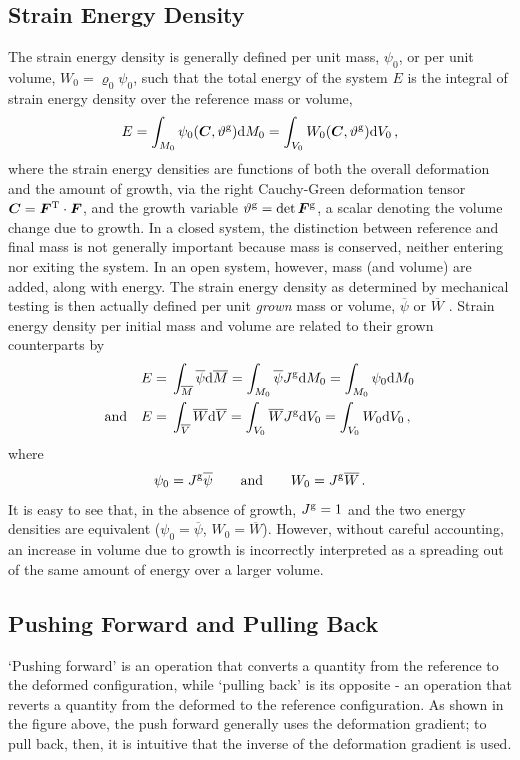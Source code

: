 \documentclass[10pt,letterpaper,oneside]{report}
\newcommand{\sca}[1]{\mbox{\rm{#1}}{}} %
\newcommand{\ten}[1]{\mbox{\boldmath $#1$}{}}
\newcommand{\scas}[1]{\mbox{{\scriptsize{${\rm{#1}}$}}}{}}
\begin{document}
\subsection{Strain Energy Density}
The strain energy density is generally defined per unit mass, $\psi_0$, or per unit volume, $W_0 = \varrho_0 \psi_0$, such that the total energy of the system $E$ is the integral of strain energy density over the reference mass or volume, 
\begin{equation}
E = \int_{M_0} \psi_0 ( \ten{C}, \vartheta^{\scas{g}} ) \sca{d}M_0 = \int_{V_0} W_0 ( \ten{C}, \vartheta^{\scas{g}} ) \sca{d}V_0 \, , 
\end{equation}
where the strain energy densities are functions of both the overall deformation and the amount of growth, via 
the right Cauchy-Green deformation tensor $\ten{C} = \ten{F}^{\scas{T}} \cdot \ten{F}$, and
the growth variable $\vartheta^{\scas{g}} = \det \ten{F}^{\scas{g}}$, a scalar denoting the volume change due to growth.  
In a closed system, the distinction between reference and final mass is not generally important because mass is conserved, neither entering nor exiting the system.  In an open system, however, mass (and volume) are added, along with energy.  The strain energy density as determined by mechanical testing is then actually defined per unit \textit{grown} mass or volume, $\overline{\psi}$ or $\overline{W}$ \cite{Ganghoffer2013}.  Strain energy density per initial mass and volume are related to their grown counterparts by 
\begin{align}
E ={}& \int_{\overline{M}} \overline{\psi} \sca{d}\overline{M} = \int_{M_0} \overline{\psi} J^{\scas{g}} \sca{d}M_0 = \int_{M_0} \psi_0 \sca{d}M_0 
\\ \mbox{and} \quad 
E ={}& \int_{\overline{V}} \overline{W} \sca{d}\overline{V} = \int_{V_0} \overline{W} J^{\scas{g}} \sca{d}V_0 = \int_{V_0} W_0 \sca{d}V_0 \, , 
\end{align}
where 
\begin{equation}
\psi_0 = J^{\scas{g}} \overline{\psi} \qquad \mbox{and} \qquad W_0 = J^{\scas{g}} \overline{W} \, . 
\end{equation}
It is easy to see that, in the absence of growth, $J^{\scas{g}} = 1$ and the two energy densities are equivalent ($\psi_0 = \overline{\psi}$, $W_0 = \overline{W}$).  However, without careful accounting, an increase in volume due to growth is incorrectly interpreted as a spreading out of the same amount of energy over a larger volume. 


\subsection{Pushing Forward and Pulling Back}
`Pushing forward' is an operation that converts a quantity from the reference to the deformed configuration, while `pulling back' is its opposite - an operation that reverts a quantity from the deformed to the reference configuration.  As shown in the figure above, the push forward generally uses the deformation gradient; to pull back, then, it is intuitive that the inverse of the deformation gradient is used.  
\end{document}

